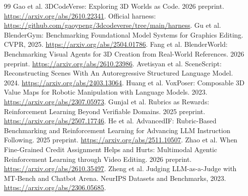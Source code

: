 \documentclass[10pt]{article}
\begin{document}
\clearpage\begingroup\small\begin{thebibliography}{99}
 Gao et al. 3DCodeVerse: Exploring 3D Worlds as Code. 2026 preprint. \url{https://arxiv.org/abs/2610.22341}. Official harness: \url{https://github.com/gaoypeng/3dcodeverse/tree/main/harness}.
 Gu et al. BlenderGym: Benchmarking Foundational Model Systems for Graphics Editing. CVPR, 2025. \url{https://arxiv.org/abs/2504.01786}.
 Fang et al. BlenderWorld: Benchmarking Visual Agents for 3D Creation from Real-World References. 2026 preprint. \url{https://arxiv.org/abs/2610.23986}.
 Avetisyan et al. SceneScript: Reconstructing Scenes With An Autoregressive Structured Language Model. 2024. \url{https://arxiv.org/abs/2403.13064}.
 Huang et al. VoxPoser: Composable 3D Value Maps for Robotic Manipulation with Language Models. 2023. \url{https://arxiv.org/abs/2307.05973}.
 Gunjal et al. Rubrics as Rewards: Reinforcement Learning Beyond Verifiable Domains. 2025 preprint. \url{https://arxiv.org/abs/2507.17746}.
 He et al. AdvancedIF: Rubric-Based Benchmarking and Reinforcement Learning for Advancing LLM Instruction Following. 2025 preprint. \url{https://arxiv.org/abs/2511.10507}.
 Zhao et al. When Fine-Grained Credit Assignment Helps and Hurts: Multimodal Agentic Reinforcement Learning through Video Editing. 2026 preprint. \url{https://arxiv.org/abs/2610.35497}.
 Zheng et al. Judging LLM-as-a-Judge with MT-Bench and Chatbot Arena. NeurIPS Datasets and Benchmarks, 2023. \url{https://arxiv.org/abs/2306.05685}.
\end{thebibliography}\endgroup
\end{document}
